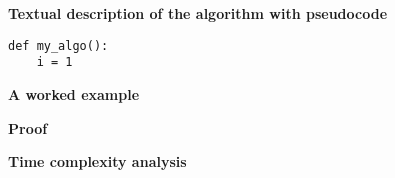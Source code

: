 \documentclass{article}
\begin{document}

\textbf{Textual description of the algorithm with pseudocode}

\begin{verbatim}
def my_algo():
    i = 1
\end{verbatim}


\textbf{A worked example}

\textbf{Proof}


\textbf{Time complexity analysis}

\newpage

\newpage
\end{document}
